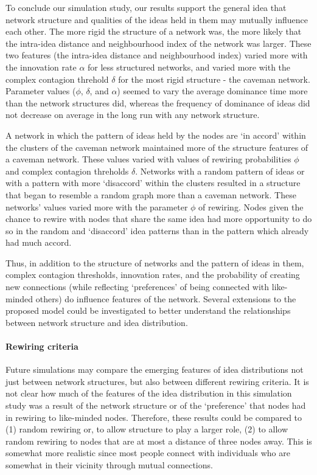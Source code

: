 
To conclude our simulation study, our results support the general idea that network structure and qualities of the ideas held in them may mutually influence each other. The more rigid the structure of a network was, the more likely that the intra-idea distance and neighbourhood index of the network was larger. These two features (the intra-idea distance and neighbourhood index) varied more with the innovation rate $\alpha$ for less structured networks, and varied more with the complex contagion threhold $\delta$ for the most rigid structure - the caveman network. Parameter values ($\phi$, $\delta$, and $\alpha$) seemed to vary the average dominance time more than the network structures did, whereas the frequency of dominance of ideas did not decrease on average in the long run with any network structure.

A network in which the pattern of ideas held by the nodes are `in accord' within the clusters of the caveman network maintained more of the structure features of a caveman network. These values varied with values of rewiring probabilities $\phi$ and complex contagion threholds $\delta$. Networks with a random pattern of ideas or with a pattern with more `disaccord' within the clusters resulted in a structure that began to resemble a random graph more than a caveman network. These networks' values varied more with the parameter $\phi$ of rewiring. Nodes given the chance to rewire with nodes that share the same idea had more opportunity to do so in the random and `disaccord' idea patterns than in the pattern which already had much accord.

Thus, in addition to the structure of networks and the pattern of ideas in them, complex contagion thresholds, innovation rates, and the probability of creating new connections (while reflecting `preferences' of being connected with like-minded others) do influence features of the network. Several extensions to the proposed model could be investigated to better understand the relationships between network structure and idea distribution.

\paragraph{Rewiring criteria}
Future simulations may compare the emerging features of idea distributions not just between network structures, but also between different rewiring criteria. It is not clear how much of the features of the idea distribution in this simulation study was a result of the network structure or of the `preference' that nodes had in rewiring to like-minded nodes. Therefore, these results could be compared to (1) random rewiring or, to allow structure to play a larger role, (2) to allow random rewiring to nodes that are at most a distance of three nodes away. This is somewhat more realistic since most people connect with individuals who are somewhat in their vicinity through mutual connections. 

